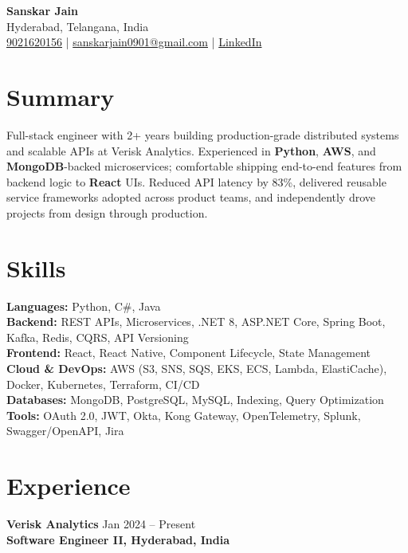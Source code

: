\documentclass[letterpaper,10pt]{article}
\begin{document}
\begin{center}
    {\LARGE \textbf{Sanskar Jain}} \\
    Hyderabad, Telangana, India \\
    \href{tel:9021620156}{9021620156} \;|\;
    \href{mailto:sanskarjain0901@gmail.com}{sanskarjain0901@gmail.com} \;|\;
    \href{https://www.linkedin.com/in/sanskar-jain0901/}{LinkedIn}
\end{center}

\vspace{3pt}

\section*{Summary}
Full-stack engineer with 2+ years building production-grade distributed systems and scalable APIs at Verisk Analytics.
Experienced in \textbf{Python}, \textbf{AWS}, and \textbf{MongoDB}-backed microservices; comfortable shipping end-to-end features from backend logic to \textbf{React} UIs.
Reduced API latency by 83\%, delivered reusable service frameworks adopted across product teams, and independently drove projects from design through production.

\section*{Skills}
\textbf{Languages:} Python, C\#, Java \\
\textbf{Backend:} REST APIs, Microservices, .NET 8, ASP.NET Core, Spring Boot, Kafka, Redis, CQRS, API Versioning \\
\textbf{Frontend:} React, React Native, Component Lifecycle, State Management \\
\textbf{Cloud \& DevOps:} AWS (S3, SNS, SQS, EKS, ECS, Lambda, ElastiCache), Docker, Kubernetes, Terraform, CI/CD \\
\textbf{Databases:} MongoDB, PostgreSQL, MySQL, Indexing, Query Optimization \\
\textbf{Tools:} OAuth 2.0, JWT, Okta, Kong Gateway, OpenTelemetry, Splunk, Swagger/OpenAPI, Jira

\section*{Experience}

\textbf{Verisk Analytics} \hfill Jan 2024 -- Present \\
\textbf{Software Engineer II, Hyderabad, India}
\end{document}
